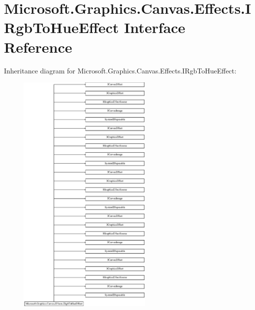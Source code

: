 \hypertarget{interface_microsoft_1_1_graphics_1_1_canvas_1_1_effects_1_1_i_rgb_to_hue_effect}{}\section{Microsoft.\+Graphics.\+Canvas.\+Effects.\+I\+Rgb\+To\+Hue\+Effect Interface Reference}
\label{interface_microsoft_1_1_graphics_1_1_canvas_1_1_effects_1_1_i_rgb_to_hue_effect}
Inheritance diagram for Microsoft.\+Graphics.\+Canvas.\+Effects.\+I\+Rgb\+To\+Hue\+Effect\+:\begin{figure}[H]
\begin{center}
\leavevmode
\includegraphics[height=12.000000cm]{interface_microsoft_1_1_graphics_1_1_canvas_1_1_effects_1_1_i_rgb_to_hue_effect}
\end{center}
\end{figure}
